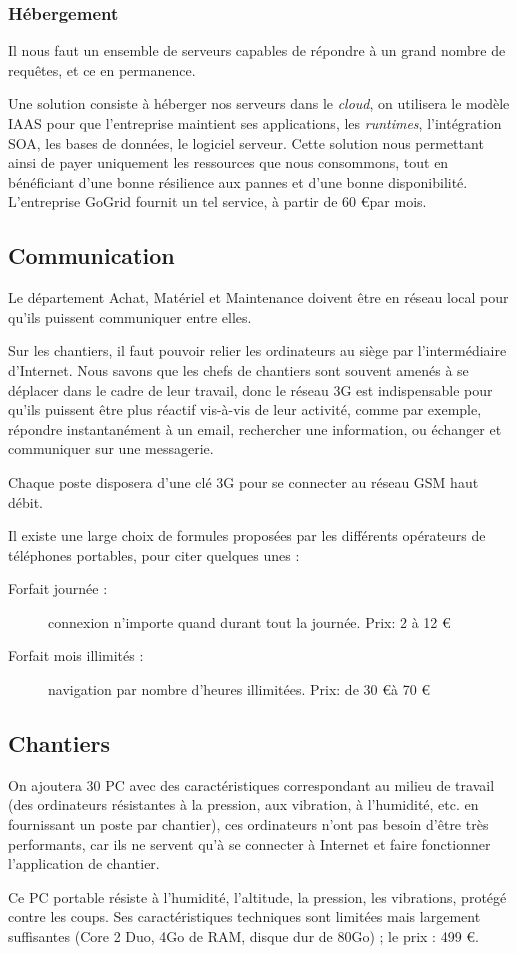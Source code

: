 	\subsubsection{Hébergement}
    Il nous faut un ensemble de serveurs capables de répondre à un grand
    nombre de requêtes, et ce en permanence.

Une solution consiste à héberger nos serveurs dans le \textsl{cloud}, on
utilisera le modèle IAAS pour  que l'entreprise maintient ses applications,
les {\sl runtimes}, l'intégration SOA, les bases de données, le logiciel
serveur.  Cette solution nous permettant ainsi de payer uniquement les
ressources que nous consommons, tout en bénéficiant d'une bonne résilience
aux pannes et d'une bonne disponibilité.  L'entreprise GoGrid fournit un
tel service, à partir de 60 \euro par mois.


\subsection{Communication}
Le département Achat, Matériel et Maintenance doivent être en réseau local
pour qu'ils puissent  communiquer entre elles.

Sur les chantiers, il faut pouvoir relier les ordinateurs au siège par
l'intermédiaire d'Internet.  Nous savons que les chefs de chantiers sont
souvent amenés à se déplacer dans le cadre de leur travail, donc le réseau
3G est indispensable pour qu'ils puissent être plus réactif vis-à-vis de
leur activité, comme par exemple, répondre instantanément à un email,
rechercher une information, ou échanger et communiquer sur une messagerie. 

Chaque poste disposera d’une clé 3G pour se connecter au réseau GSM haut
débit.

Il existe une large choix de formules proposées par les différents
opérateurs de téléphones portables, pour citer quelques unes :

\begin{description}
\item[Forfait journée :] connexion n'importe quand durant tout la journée. Prix: 2 à
12 \euro

\item[Forfait mois illimités :] navigation par nombre d'heures illimitées.  Prix:
de 30 \euro à 70 \euro
\end{description}


\subsection{Chantiers}
On ajoutera 30 PC avec des caractéristiques correspondant au milieu de
travail (des ordinateurs résistantes à la pression, aux vibration, à
l'humidité, etc.  en fournissant un poste par chantier), ces ordinateurs
n'ont pas besoin d’être très performants, car ils ne servent qu'à se
connecter à Internet et faire fonctionner l'application de chantier.

Ce PC portable résiste à l'humidité, l'altitude,
la pression, les vibrations, protégé contre les coups.
Ses caractéristiques techniques sont limitées mais largement suffisantes
(Core 2 Duo, 4Go de RAM, disque dur de 80Go) ; le prix : 499 \euro.

